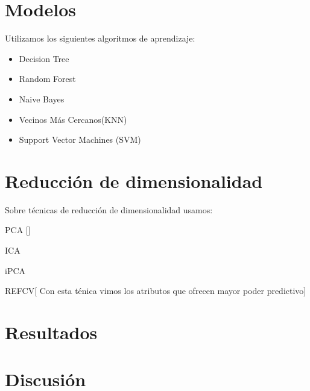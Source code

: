 \documentclass[10pt, a4paper]{article}
\begin{document}
\section{Modelos}
Utilizamos los siguientes algoritmos de aprendizaje:

\begin{itemize}
\item Decision Tree
\item Random Forest
\item Naive Bayes
\item Vecinos Más Cercanos(KNN)
\item Support Vector Machines (SVM)
\end{itemize}

\section{Reducción de dimensionalidad} 
Sobre técnicas de reducción de dimensionalidad usamos:

\begin{description}
\item PCA []
\item ICA
\item iPCA
\item REFCV[ Con esta ténica vimos los atributos que ofrecen mayor poder predictivo]
\end{description}

\section{Resultados}
% 
 
\section{Discusión}
 

\end{document}
